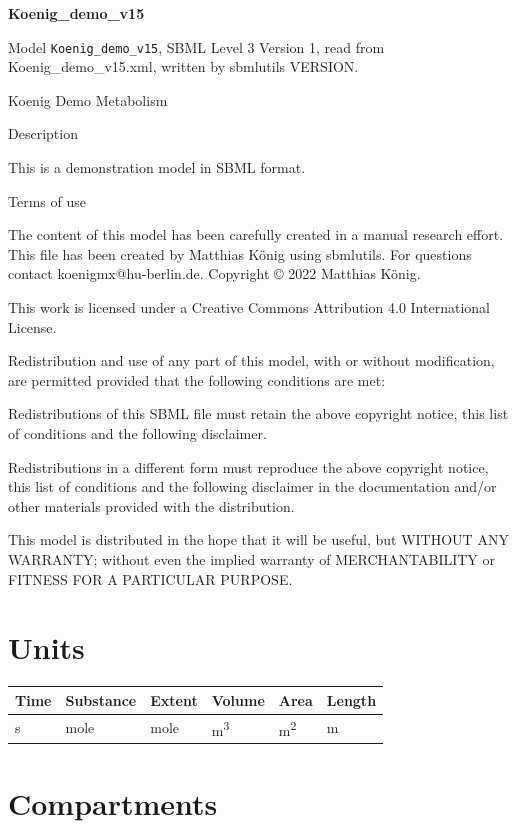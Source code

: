 \documentclass{article}
\begin{document}
{\centering\LARGE\bfseries Koenig\_\allowbreak{}demo\_\allowbreak{}v15\par}
\bigskip

Model \texttt{Koenig\_}\allowbreak{}\texttt{demo\_}\allowbreak{}\texttt{v15}, SBML Level 3 Version 1, read from Koenig\_\allowbreak{}demo\_\allowbreak{}v15.xml, written by sbmlutils VERSION.

Koenig Demo Metabolism

Description

This is a demonstration model in SBML format.

Terms of use

The content of this model has been carefully created in a manual research effort. This file has been created by Matthias König using sbmlutils. For questions contact koenigmx@hu-berlin.de. Copyright © 2022 Matthias König.

This work is licensed under a Creative Commons Attribution 4.0 International License.

Redistribution and use of any part of this model, with or without modification, are permitted provided that the following conditions are met:

Redistributions of this SBML file must retain the above copyright notice, this list of conditions and the following disclaimer.

Redistributions in a different form must reproduce the above copyright notice, this list of conditions and the following disclaimer in the documentation and/or other materials provided with the distribution.

This model is distributed in the hope that it will be useful, but WITHOUT ANY WARRANTY; without even the implied warranty of MERCHANTABILITY or FITNESS FOR A PARTICULAR PURPOSE.

\section{Units}

\begin{tabular}{@{}llllll@{}}
  \toprule
  \textbf{Time} & \textbf{Substance} & \textbf{Extent} & \textbf{Volume} & \textbf{Area} & \textbf{Length} \\
  \midrule
  s & mole & mole & m\textsuperscript{3} & m\textsuperscript{2} & m \\
  \bottomrule
\end{tabular}

\section{Compartments}
\end{document}

